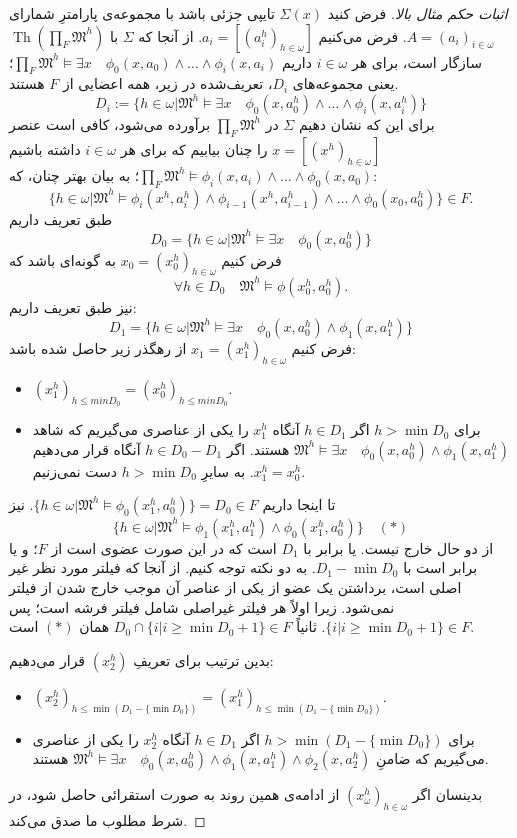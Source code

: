 \documentclass[12pt,a4paper]{article}
\theoremstyle{colorhead}
\DeclareMathOperator{\Th}{Th}
\begin{document}
 \begin{proof}[اثبات حکم مثال بالا]
 فرض کنید
 $\Sigma(x)$
 تایپی جزئی باشد با مجموعه‌ی پارامترِ شمارای
\mbox{$A=(a_i)_{i\in \omega}$}.
 فرض می‌کنیم
 $a_i=[(a_i^h)_{h\in \omega}]$.
 از آنجا که 
 $\Sigma$
 با
 $\Th(\prod_F \mathfrak{M}^h)$
 سازگار است، برای هر
 $i\in \omega$
 داریم
 $\prod_F \mathfrak{M}^h\models \exists x \quad \phi_0(x,a_0)\wedge \ldots\wedge \phi_i(x,a_i)$؛ 
 یعنی
مجموعه‌های
$D_i$،
تعریف‌شده در زیر، همه‌ اعضایی از
$F$
هستند.
 \[
 D_i:=\{h\in \omega| \mathfrak{M}^h\models \exists x\quad  \phi_0(x,a_0^h)\wedge \ldots \wedge \phi_i(x,a_i^h)\}
 \]
 برای این که نشان دهیم
 $\Sigma$
 در 
 $\prod_F \mathfrak{M}^h$
 برآورده می‌شود، کافی است عنصر
 $x=[(x^h)_{h\in \omega}]$
 را چنان بیابیم که برای هر
 $i\in \omega$
داشته باشیم
$\prod_F \mathfrak{M}^h\models \phi_i(x,a_i)\wedge \ldots\wedge\phi_0(x,a_0)$؛
به بیان بهتر چنان، که:
\[\{h\in \omega|\mathfrak{M}^h\models \phi_i(x^h,a_i^h)\wedge \phi_{i-1}(x^h,a_{i-1}^h)\wedge\ldots \wedge\phi_0(x_0,a_0^h)\}\in F.\]
طبق تعریف داریم
\[
D_0=
 \{h\in \omega| \mathfrak{M}^h\models \exists x\quad  \phi_0(x,a_0^h)\}
\] 
فرض کنیم
$x_0=(x_0^h)_{h\in \omega}$
 به گونه‌ای باشد که 
\[\forall h\in D_0\quad \mathfrak{M}^h\models \phi(x_0^h,a_0^h).\]
نیز طبق تعریف داریم:
\[
D_1=
 \{h\in \omega| \mathfrak{M}^h\models \exists x\quad  \phi_0(x,a_0^h)\wedge \phi_1(x,a_1^h)\}
 \]
  فرض کنیم
  $x_1=(x_1^h)_{h\in \omega}$
  از رهگذر زیر حاصل شده باشد:
  \begin{itemize}
  \item 
  $(x_1^h)_{h\leq min D_0}=(x_0^h)_{h\leq min D_0}$.
  \item 
  برای 
  $h>\min D_0$
  اگر
  $h\in D_1$
  آنگاه
  $x_1^h$
  را یکی از عناصری می‌گیریم که شاهد
 \mbox{$\mathfrak{M}^h\models \exists x\quad \phi_0(x,a_0^h)\wedge \phi_1(x,a_1^h)$}
  هستند. اگر
  $h\in D_0-D_1$
  آنگاه
  قرار می‌دهیم
  $x_1^h=x_0^h$.
  به سایرِ
  $h>\min D_0$
  دست نمی‌زنیم.
  \end{itemize}
تا اینجا داریم
$\{h\in \omega |\mathfrak{M}^h\models \phi_0(x_1^h,a_0^h)\}=D_0\in F$.
نیز 
\[\{h\in \omega |\mathfrak{M}^h\models \phi_1(x_1^h,a_1^h)\wedge \phi_0(x_1^h,a_0^h)\}\quad (*)\]
از دو حال خارج نیست. یا برابر با
$D_1$
است که در این صورت عضوی است از
$F$؛
و یا برابر است با
$D_1-\min D_0$.
به دو نکته توجه کنیم. از آنجا که فیلتر مورد نظر غیر اصلی است، برداشتن یک عضو از یکی از 
عناصر آن موجب خارج شدن از فیلتر نمی‌شود. زیرا
اولاً هر فیلتر غیراصلی شامل فیلتر فرشه است؛ پس
$\{i|i\geq \min D_0+1\}\in F$.
ثانیاً
$D_0\cap \{i|i\geq \min D_0+1\}\in F$
همان 
$(*)$
است.
\par 
بدین ترتیب برای تعریفِ
$(x_2^h)$
قرار می‌دهیم:
 \begin{itemize}
  \item 
  $(x_2^h)_{h\leq \min(D_1-\{\min D_0\})}=(x_1^h)_{h\leq \min (D_1-\{\min D_0\})}$.
  \item 
  برای 
  $h> \min(D_1-\{\min D_0\})$
  اگر
  $h\in D_1$
  آنگاه
  $x_2^h$
  را یکی از عناصری می‌گیریم که ضامنِ
  $\mathfrak{M}^h\models \exists x\quad \phi_0(x,a_0^h)\wedge \phi_1(x,a_1^h)\wedge\phi_2(x,a_2^h)$
  هستند. 
  \end{itemize}
  بدینسان اگر
  $(x_\omega^h)_{h\in \omega}$
  از ادامه‌ی همین روند به صورت استقرائی حاصل شود، در شرط مطلوب ما صدق می‌کند. 
  \end{proof}
\end{document}

